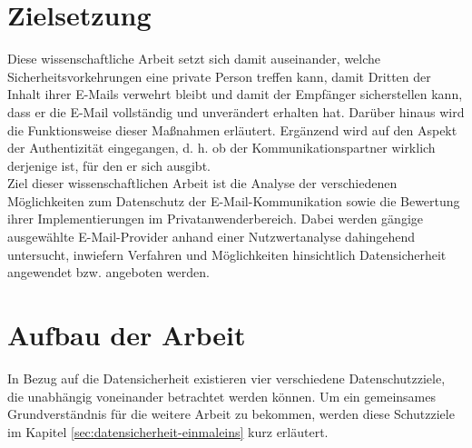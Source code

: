 \documentclass  [paper=a4,
				fontsize=12pt,
				listof=totoc,
				bibliography=totoc
				]{scrreprt}
\begin{document}
		\section{Zielsetzung}
		Diese wissenschaftliche Arbeit setzt sich damit auseinander, welche Sicherheitsvorkehrungen eine private Person treffen kann, damit Dritten der Inhalt ihrer E-Mails verwehrt bleibt und damit der Empfänger sicherstellen kann, dass er die E-Mail vollständig und unverändert erhalten hat. Darüber hinaus wird die Funktionsweise dieser Maßnahmen erläutert. Ergänzend wird auf den Aspekt der Authentizität eingegangen, d. h. ob der Kommunikationspartner wirklich derjenige ist, für den er sich ausgibt. \medskip\\
		Ziel dieser wissenschaftlichen Arbeit ist die Analyse der verschiedenen Möglichkeiten zum Datenschutz der E-Mail-Kommunikation sowie die Bewertung ihrer Implementierungen im Privatanwenderbereich.
		Dabei werden gängige ausgewählte E-Mail-Provider anhand einer Nutzwertanalyse dahingehend untersucht, inwiefern Verfahren und Möglichkeiten hinsichtlich Datensicherheit angewendet bzw. angeboten werden.
		
		\section{Aufbau der Arbeit}
		In Bezug auf die Datensicherheit existieren vier verschiedene Datenschutzziele, die unabhängig voneinander betrachtet werden können. 
		Um ein gemeinsames Grundverständnis für die weitere Arbeit zu bekommen, werden diese Schutzziele im  Kapitel \ref{sec:datensicherheit-einmaleins} kurz erläutert.
		
\end{document}

